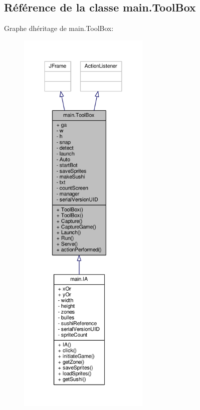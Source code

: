 \hypertarget{classmain_1_1ToolBox}{}\subsection{Référence de la classe main.\+Tool\+Box}
\label{classmain_1_1ToolBox}


Graphe d\textquotesingle{}héritage de main.\+Tool\+Box\+:\nopagebreak
\begin{figure}[H]
\begin{center}
\leavevmode
\includegraphics[height=550pt]{classmain_1_1ToolBox__inherit__graph}
\end{center}
\end{figure}


